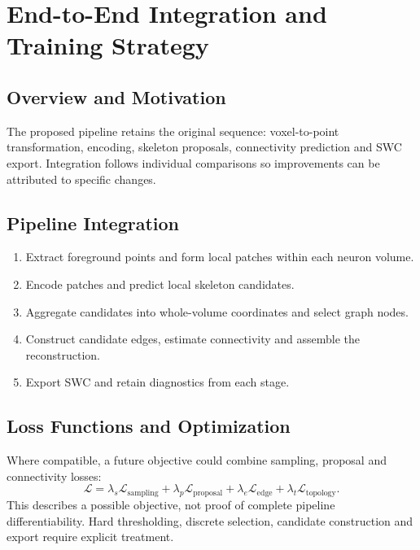 \documentclass[11pt,a4paper]{article}
\begin{document}
\section{End-to-End Integration and Training Strategy}

\subsection{Overview and Motivation}
The proposed pipeline retains the original sequence: voxel-to-point transformation, encoding, skeleton proposals, connectivity prediction and SWC export. Integration follows individual comparisons so improvements can be attributed to specific changes.

\subsection{Pipeline Integration}
\begin{enumerate}
    \item Extract foreground points and form local patches within each neuron volume.
    \item Encode patches and predict local skeleton candidates.
    \item Aggregate candidates into whole-volume coordinates and select graph nodes.
    \item Construct candidate edges, estimate connectivity and assemble the reconstruction.
    \item Export SWC and retain diagnostics from each stage.
\end{enumerate}

\subsection{Loss Functions and Optimization}
Where compatible, a future objective could combine sampling, proposal and connectivity losses:
\begin{equation}
    \mathcal{L}
    = \lambda_s\mathcal{L}_{\mathrm{sampling}}
    + \lambda_p\mathcal{L}_{\mathrm{proposal}}
    + \lambda_e\mathcal{L}_{\mathrm{edge}}
    + \lambda_t\mathcal{L}_{\mathrm{topology}}.
\end{equation}
This describes a possible objective, not proof of complete pipeline differentiability. Hard thresholding, discrete selection, candidate construction and export require explicit treatment.
\end{document}
